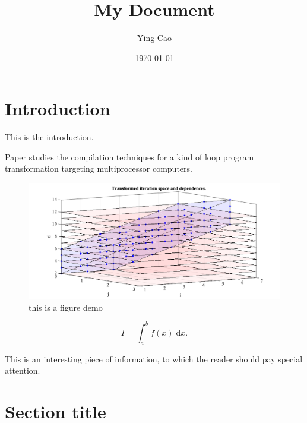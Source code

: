 \documentclass{article}
\title{My Document}
\author{Ying Cao}
\date{\today}
\begin{document}


\maketitle %
\tableofcontents

\noindent
\linespread{1.2}
\selectfont
\setlength{\topskip}{0ex}
\setlength{\parskip}{1ex}
\setlength{\lineskip}{1em}


\section{Introduction}

This is the introduction. 

Paper \cite{lamport1974parallel} studies the compilation techniques for a kind of loop program transformation
targeting multiprocessor computers.

\begin{figure}[ht]
  \centering
  \includegraphics[scale=0.4]{figures/figure1.png}
  \caption{this is a figure demo}
  \label{fig:label}
\end{figure}

\begin{equation}
I = \int_{a}^{b} f(x) \; \text{d}x.
\end{equation}

\begin{info} %
This is an interesting piece of information, to which the reader should pay special attention.
\end{info}

\section{Section title} %
\end{document}
